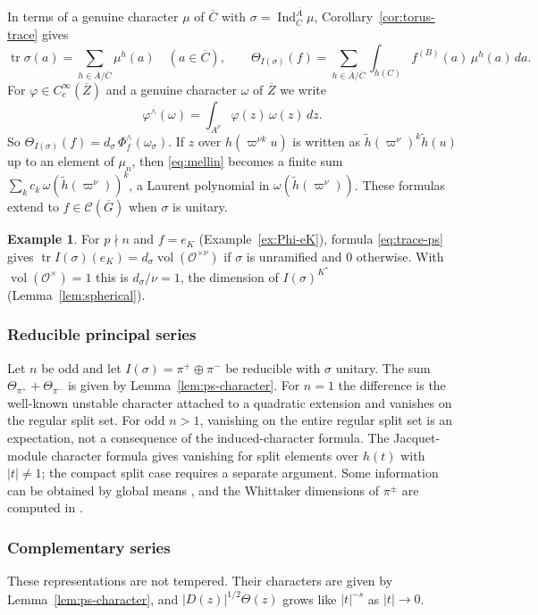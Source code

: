 \documentclass[12pt,letterpaper]{article}
\numberwithin{equation}{section}
\theoremstyle{definition}
\newtheorem{xexample}[theorem]{Example}
\newcommand{\OF}{\mathcal O}
\newcommand{\vp}{\varpi}
\newcommand{\bG}{\overline{G}}
\newcommand{\bA}{\overline{A}}
\newcommand{\bC}{\overline{C}}
\newcommand{\bZ}{\overline{Z}}
\newcommand{\hl}{\tilde h}
\newcommand{\calC}{\mathcal C}
\DeclareMathOperator{\tr}{tr}
\DeclareMathOperator{\Ind}{Ind}
\DeclareMathOperator{\vol}{vol}
\begin{document}
In terms of a genuine character $\mu$ of $\bC$ with $\sigma=\Ind_{\bC}^{\bA}\mu$,
Corollary~\ref{cor:torus-trace} gives
\begin{equation}\label{eq:trace-mu}
\tr\sigma(a)=\sum_{h\in\bA/\bC}\mu^h(a)\quad(a\in\bC),\qquad
\Theta_{I(\sigma)}(f)=\sum_{h\in\bA/\bC}\int_{h(C)}f^{(B)}(a)\,\mu^h(a)\,da .
\end{equation}
For $\varphi\in C_c^\infty(\bZ)$ and a genuine character $\omega$ of $\bZ$ we write
\begin{equation}\label{eq:mellin}
\varphi^\wedge(\omega)=\int_{A^\nu}\varphi(z)\,\omega(z)\,dz .
\end{equation}
So $\Theta_{I(\sigma)}(f)=d_\sigma\,\Phi_f^\wedge(\omega_\sigma)$.  If $z$ over
$h(\vp^{\nu k}u)$ is written as $\hl(\vp^\nu)^k\hl(u)$ up to an element of $\mu_n$, then
\eqref{eq:mellin} becomes a finite sum $\sum_kc_k\,\omega(\hl(\vp^\nu))^k$, a Laurent
polynomial in $\omega(\hl(\vp^\nu))$.  These formulas extend to $f\in\calC(\bG)$ when $\sigma$
is unitary.

\begin{xexample}\label{ex:trace-eK}
For $p\nmid n$ and $f=e_K$ (Example~\ref{ex:Phi-eK}), formula \eqref{eq:trace-ps} gives
$\tr I(\sigma)(e_K)=d_\sigma\vol(\OF^{\times\nu})$ if $\sigma$ is unramified and $0$ otherwise.
With $\vol(\OF^\times)=1$ this is $d_\sigma/\nu=1$, the dimension of $I(\sigma)^{K^*}$
(Lemma~\ref{lem:spherical}).
\end{xexample}

\subsubsection{Reducible principal series}
Let $n$ be odd and let $I(\sigma)=\pi^+\oplus\pi^-$ be reducible with $\sigma$ unitary.  The
sum $\Theta_{\pi^+}+\Theta_{\pi^-}$ is given by Lemma~\ref{lem:ps-character}.
For $n=1$ the difference is the well-known unstable character attached to a
quadratic extension and vanishes on the regular split set. For odd $n>1$,
vanishing on the entire regular split set is an expectation, not a consequence
of the induced-character formula. The Jacquet-module character formula gives
vanishing for split elements over $h(t)$ with $|t|\ne1$; the compact split
case requires a separate argument. Some information can be obtained by global
means \cite{Jo88,Fl80}, and the Whittaker dimensions of $\pi^\pm$ are computed
in \cite{Sz24}.

\subsubsection{Complementary series}
These representations are not tempered.  Their characters are given by
Lemma~\ref{lem:ps-character}, and $|D(z)|^{1/2}\Theta(z)$ grows like $|t|^{-s}$ as
$|t|\to0$.
\end{document}
